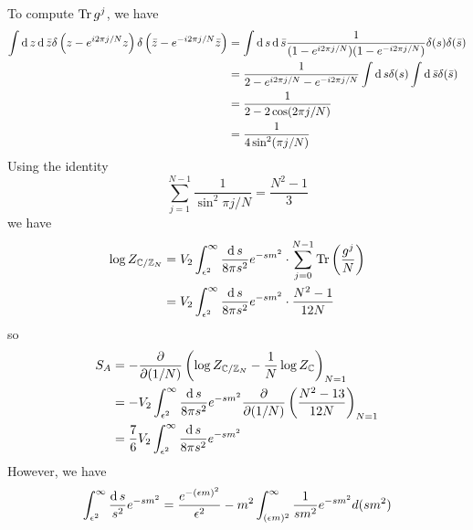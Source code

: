 \subsection{}
To compute $\operatorname{Tr} g^j$, we have
\begin{equation}
	 \begin{split}
	 \int \operatorname{d} z \operatorname{d} \bar{z} \delta\left(z-e^{i 2\pi j/N}z\right) \delta \left(\bar{z} - e^{-i2\pi j/N}\bar{z} \right)&= \int \operatorname{d} s \operatorname{d}\bar{s} \frac{1}{(1- e^{i 2\pi j/N})(1-e^{-i 2\pi j/N})} \delta(s) \delta(\bar{s})\\
	 &= \frac{1}{2- e^{i 2\pi j/N}-e^{-i 2\pi j/N}} \int \operatorname{d} s \delta(s)\int \operatorname{d}\bar{s} \delta(\bar{s})\\
	 & = \frac{1}{2- 2\cos(2\pi j/N)}\\
	 & =\frac{1}{4 \sin^2 (\pi j/N) }
	 \end{split}
\end{equation}
Using the identity
\[
\sum_{j=1}^{N-1} \frac{1}{\sin^2 \pi j/N} = \frac{N^2-1}{3}
\] 
we have 
\begin{equation}
	\begin{split}
	\log Z_{\mathbb{C}/\mathbb{Z}_N}& = V_2 \int_{\epsilon^2}^{\infty} \frac{\operatorname{d} s}{8 \pi s^2} e^{-sm^2} \cdot \sum_{j=0}^{N-1} \operatorname{Tr} \left( \frac{g^j}{N} \right)\\
	& = V_2 \int_{\epsilon^2}^{\infty} \frac{\operatorname{d} s}{8 \pi s^2} e^{-sm^2} \cdot\frac{N^2-1}{12N}
	\end{split}
\end{equation}
so
\begin{equation}
	\begin{split}
	S_A & = -\frac{\partial}{\partial (1/N)} \left(\log Z_{\mathbb{C}/\mathbb{Z}_N} - \frac{1}{N} \log Z_{\mathbb{C}} \right)_{N=1}\\
	& = - V_2 \int_{\epsilon^2}^{\infty} \frac{\operatorname{d} s}{8 \pi s^2} e^{-sm^2}\frac{\partial}{\partial (1/N)}\left( \frac{N^2-13}{12N} \right)_{N=1}\\
	& = \frac{7}{6} V_2 \int_{\epsilon^2}^{\infty} \frac{\operatorname{d} s}{8 \pi s^2} e^{-sm^2}
	\end{split}
\end{equation}
However, we have 
\begin{equation}
	\begin{split}
	\int_{\epsilon^2}^{\infty}\frac{\operatorname{d} s}{s^2}e^{-sm^2}=\frac{e^{-(\epsilon m)^2}}{\epsilon^2} - m^2 \int_{(\epsilon m)^2}^{\infty} \frac{1}{sm^2} e^{-sm^2}d(sm^2)  \\
	\end{split}
\end{equation}
